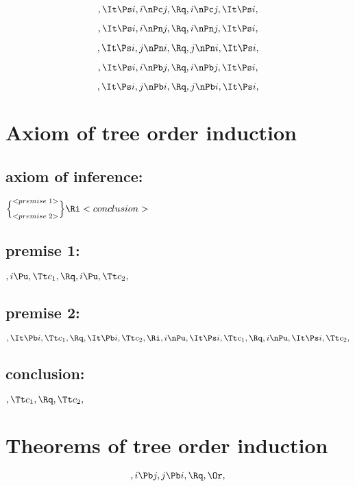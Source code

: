 \[,\It \Ps i, i \nPc j, \Rq , i \nPc j, \It \Ps i,\]

\[,\It \Ps i, i \nPn j, \Rq , i \nPn j, \It \Ps i,\]

\[,\It \Ps i, j \nPn i, \Rq , j \nPn i, \It \Ps i,\]

\[,\It \Ps i, i \nPb j, \Rq , i \nPb j, \It \Ps i,\]

\[,\It \Ps i, j \nPb i, \Rq , j \nPb i, \It \Ps i,\]








\bigskip
\bigskip
\bigskip
\bigskip
\section{Axiom of tree order induction}
\subsection{axiom of inference:}
\begin{math}
\Bigl\{ ^{<premise \; 1>}_{<premise \;  2>}\Bigl\} \Ri <conclusion>
\end{math}
\bigskip
\bigskip
\subsection{premise 1:}
\begin{math}
, i \Pu, \Tt c_1, \Rq , i \Pu, \Tt c_2,
\end{math}
\bigskip
\bigskip
\subsection{premise 2:}
\begin{math}
,\It \Pb i, \Tt c_1 , \Rq , \It \Pb i, \Tt c_2 , \Ri \\\\
,i \nPu, \It \Ps i, \Tt c_1, \Rq , i \nPu, \It \Ps i, \Tt c_2,
\end{math}
\bigskip
\bigskip
\subsection{conclusion:}
\begin{math}
, \Tt c_1, \Rq , \Tt c_2,
\end{math}


\bigskip
\bigskip
\section{Theorems of tree order induction}
\[, i \Pb j, j \Pb i, \Rq , \Or,\]

